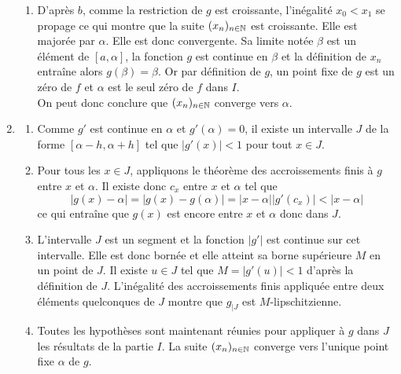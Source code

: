 \begin{enumerate}
\begin{enumerate}
\item D'après $b$, comme la restriction de $g$ est croissante, l'inégalité $x_0 < x_1$ se propage ce qui montre que la suite $(x_n)_{n\in\mathbb{N}}$ est croissante. Elle est majorée par $\alpha$. Elle est donc convergente. Sa limite notée $\beta$ est un élément de $[a,\alpha]$, la fonction $g$ est continue en $\beta$ et la définition de $x_n$ entraîne alors $g(\beta)=\beta$. Or par définition de $g$, un point fixe de $g$ est un zéro de $f$ et $\alpha$ est le seul zéro de $f$ dans $I$.\\
On peut donc conclure que $(x_n)_{n\in\mathbb{N}}$ converge vers $\alpha$.
\end{enumerate}
\item
\begin{enumerate}
 \item Comme $g'$ est continue en $\alpha$ et $g'(\alpha)=0$, il existe un intervalle $J$ de la forme $[\alpha-h,\alpha+h]$ tel que $|g'(x)|<1$ pour tout $x\in J$.
\item Pour tous les $x\in J$, appliquons le théorème des accroissements finis à $g$ entre $x$ et $\alpha$. Il existe donc $c_x$ entre $x$ et $\alpha$ tel que
\begin{displaymath}
 |g(x)-\alpha| = |g(x)-g(\alpha)| = |x-\alpha||g'(c_x)|<|x-\alpha|
\end{displaymath}
 ce qui entraîne que $g(x)$ est encore entre $x$ et $\alpha$ donc dans $J$.
\item L'intervalle $J$ est un segment et la fonction $|g'|$ est continue sur cet intervalle. Elle est donc bornée et elle atteint sa borne supérieure $M$ en un point de $J$. Il existe $u\in J$ tel que $M=|g'(u)|<1$ d'après la définition de $J$. L'inégalité des accroissements finis appliquée entre deux éléments quelconques de $J$ montre que $g_{|J}$ est $M$-lipschitzienne.
\item Toutes les hypothèses sont maintenant réunies pour appliquer à $g$ dans $J$ les résultats de la partie $I$. La suite $(x_n)_{n\in \mathbb{N}}$ converge vers l'unique point fixe $\alpha$ de $g$.
\end{enumerate}

\end{enumerate}
